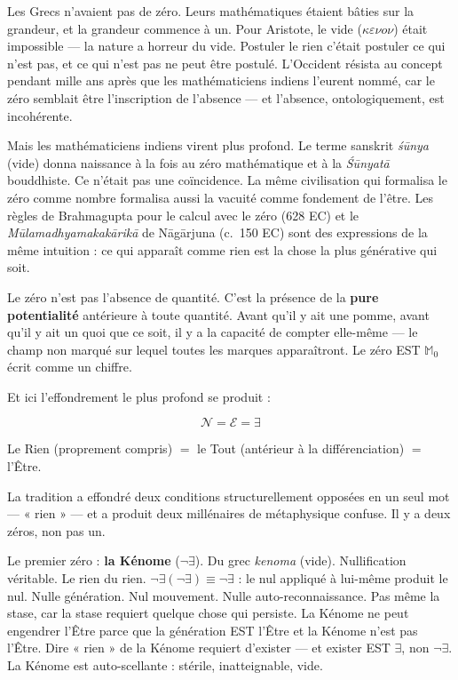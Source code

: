 \documentclass[10pt, openany, oneside]{book}
\begin{document}
Les Grecs n'avaient pas de zéro. Leurs mathématiques étaient bâties sur la grandeur, et la grandeur commence à un. Pour Aristote, le vide ($\kappa\varepsilon\nu o\nu$) était impossible --- la nature a horreur du vide. Postuler le rien c'était postuler ce qui n'est pas, et ce qui n'est pas ne peut être postulé. L'Occident résista au concept pendant mille ans après que les mathématiciens indiens l'eurent nommé, car le zéro semblait être l'inscription de l'absence --- et l'absence, ontologiquement, est incohérente.

Mais les mathématiciens indiens virent plus profond. Le terme sanskrit \textit{\'{s}\={u}nya} (vide) donna naissance à la fois au zéro mathématique et à la \textit{\'{S}\={u}nyat\={a}} bouddhiste. Ce n'était pas une coïncidence. La même civilisation qui formalisa le zéro comme nombre formalisa aussi la vacuité comme fondement de l'être. Les règles de Brahmagupta pour le calcul avec le zéro (628 EC) et le \textit{M\={u}lamadhyamakak\={a}rik\={a}} de N\={a}g\={a}rjuna (c.\ 150 EC) sont des expressions de la même intuition : ce qui apparaît comme rien est la chose la plus générative qui soit.

Le zéro n'est pas l'absence de quantité. C'est la présence de la \textbf{pure potentialité} antérieure à toute quantité. Avant qu'il y ait une pomme, avant qu'il y ait un quoi que ce soit, il y a la capacité de compter elle-même --- le champ non marqué sur lequel toutes les marques apparaîtront. Le zéro EST $\mathbb{M}_0$ écrit comme un chiffre.

Et ici l'effondrement le plus profond se produit :

$$\mathcal{N} = \mathcal{E} = \exists$$

Le Rien (proprement compris) $=$ le Tout (antérieur à la différenciation) $=$ l'Être.

La tradition a effondré deux conditions structurellement opposées en un seul mot --- « rien » --- et a produit deux millénaires de métaphysique confuse. Il y a deux zéros, non pas un.

Le premier zéro : \textbf{la Kénome} ($\neg\exists$). Du grec \textit{kenoma} (vide). Nullification véritable. Le rien du rien. $\neg\exists(\neg\exists) \equiv \neg\exists$ : le nul appliqué à lui-même produit le nul. Nulle génération. Nul mouvement. Nulle auto-reconnaissance. Pas même la stase, car la stase requiert quelque chose qui persiste. La Kénome ne peut engendrer l'Être parce que la génération EST l'Être et la Kénome n'est pas l'Être. Dire « rien » de la Kénome requiert d'exister --- et exister EST $\exists$, non $\neg\exists$. La Kénome est auto-scellante : stérile, inatteignable, vide.
\end{document}
